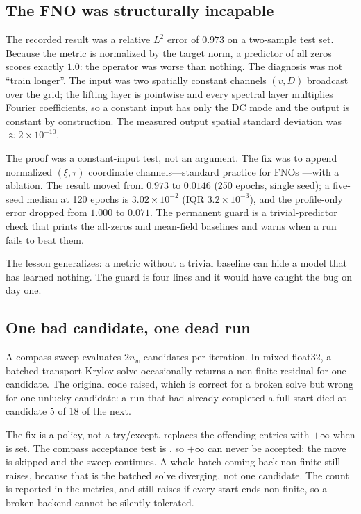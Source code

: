 \subsection{The FNO was structurally incapable}
\label{sec:failfno}

The recorded result was a relative $L^2$ error of $0.973$ on a two-sample test
set. Because the metric is normalized by the target norm, a predictor of all
zeros scores exactly $1.0$: the operator was worse than nothing. The diagnosis
was not ``train longer''. The input was two spatially constant channels
$(v,D)$ broadcast over the grid; the lifting layer is pointwise and every
spectral layer multiplies Fourier coefficients, so a constant input has only the
DC mode and the output is constant by construction. The measured output spatial
standard deviation was $\approx2\times10^{-10}$.

The proof was a constant-input test, not an argument. The fix was to append
normalized $(\xi,\tau)$ coordinate channels---standard practice for FNOs
\citep{li2020fourier}---with a  ablation. The result moved from
$0.973$ to $0.0146$ (250 epochs, single seed); a five-seed median at 120 epochs
is $3.02\times10^{-2}$ (IQR $3.2\times10^{-3}$), and the profile-only error
dropped from $1.000$ to $0.071$. The permanent guard is a trivial-predictor
check that prints the all-zeros and mean-field baselines and warns when a run
fails to beat them.

The lesson generalizes: a metric without a trivial baseline can hide a model
that has learned nothing. The guard is four lines and it would have caught the
bug on day one.

\subsection{One bad candidate, one dead run}
\label{sec:failkrylov}

A compass sweep evaluates $2n_w$ candidates per iteration. In mixed float32, a
batched transport Krylov solve occasionally returns a non-finite residual for
one candidate. The original code raised, which is correct for a broken solve but
wrong for one unlucky candidate: a run that had already completed a full start
died at candidate 5 of 18 of the next.

The fix is a policy, not a try/except.  replaces the
offending entries with $+\infty$ when  is set. The
compass acceptance test is , so $+\infty$ can never be
accepted: the move is skipped and the sweep continues. A whole batch coming back
non-finite still raises, because that is the batched solve diverging, not one
candidate. The count is reported in the metrics, and  still
raises if every start ends non-finite, so a broken backend cannot be silently
tolerated.

